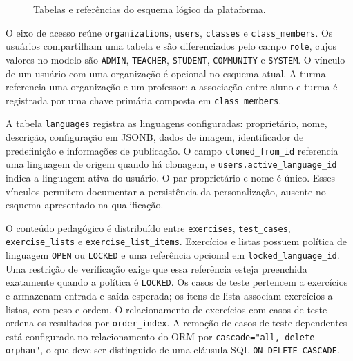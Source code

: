 \begin{figure}[p]
    \centering
    \caption{Tabelas e referências do esquema lógico da plataforma.}
    \label{fig:esquema-banco}
    
\end{figure}
\FloatBarrier

O eixo de acesso reúne \texttt{organizations}, \texttt{users}, \texttt{classes} e \texttt{class\_members}. Os usuários compartilham uma tabela e são diferenciados pelo campo \texttt{role}, cujos valores no modelo são \texttt{ADMIN}, \texttt{TEACHER}, \texttt{STUDENT}, \texttt{COMMUNITY} e \texttt{SYSTEM}. O vínculo de um usuário com uma organização é opcional no esquema atual. A turma referencia uma organização e um professor; a associação entre aluno e turma é registrada por uma chave primária composta em \texttt{class\_members}.

A tabela \texttt{languages} registra as linguagens configuradas: proprietário, nome, descrição, configuração em JSONB, dados de imagem, identificador de predefinição e informações de publicação. O campo \texttt{cloned\_from\_id} referencia uma linguagem de origem quando há clonagem, e \texttt{users.active\_language\_id} indica a linguagem ativa do usuário. O par proprietário e nome é único. Esses vínculos permitem documentar a persistência da personalização, ausente no esquema apresentado na qualificação.

O conteúdo pedagógico é distribuído entre \texttt{exercises}, \texttt{test\_cases}, \texttt{exercise\_lists} e \texttt{exercise\_list\_items}. Exercícios e listas possuem política de linguagem \texttt{OPEN} ou \texttt{LOCKED} e uma referência opcional em \texttt{locked\_language\_id}. Uma restrição de verificação exige que essa referência esteja preenchida exatamente quando a política é \texttt{LOCKED}. Os casos de teste pertencem a exercícios e armazenam entrada e saída esperada; os itens de lista associam exercícios a listas, com peso e ordem. O relacionamento de exercícios com casos de teste ordena os resultados por \texttt{order\_index}. A remoção de casos de teste dependentes está configurada no relacionamento do ORM por \texttt{cascade="all, delete-orphan"}, o que deve ser distinguido de uma cláusula SQL \texttt{ON DELETE CASCADE}.

